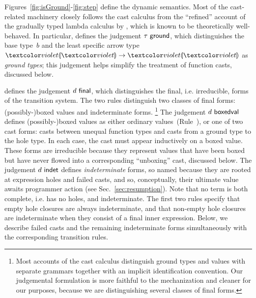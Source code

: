 




Figures~\ref{fig:isGround}-\ref{fig:step} define the dynamic semantics.
%
Most of the cast-related machinery closely follows the cast calculus from
the ``refined'' account of the gradually typed lambda calculus
by \citet{DBLP:conf/snapl/SiekVCB15}, which is known to be
theoretically well-behaved.
%
In particular,  defines the judgement
$\tau~\mathsf{ground}$, which distinguishes the base type~$b$ and the
least specific arrow type~$\tarr{\tehole}{\tehole}$ as \emph{ground
types}; this judgement helps simplify the treatment of function casts, discussed below.

%
 defines the judgement $d~\mathsf{final}$, which
distinguishes the final, i.e. irreducible, forms of the transition system.
%
The two rules distinguish two classes of final forms: (possibly-)boxed values and
indeterminate forms.%
%
\footnote{
        Most accounts of the cast calculus distinguish ground types and values
        with separate grammars together with an
        implicit identification convention.
        Our judgemental formulation is more faithful to the mechanization and
        cleaner for our purposes, because we are distinguishing several
        classes of final forms.
}
The judgement $d~\mathsf{boxedval}$ defines (possibly-)boxed values as either
ordinary values~(Rule~), or one of two cast forms: casts
between unequal function types and casts from a ground type to the hole
type. In each case, the cast must appear inductively on a boxed value.
These forms are irreducible because they represent values that have been
boxed but have never flowed into a corresponding ``unboxing'' cast,
discussed below.
%
%
The judgement $d~\mathsf{indet}$ defines \emph{indeterminate} forms, so named
because they are rooted at expression holes and failed casts, and so,
conceptually, their ultimate value awaits programmer action (see
Sec.~\ref{sec:resumption}). Note that no term is both complete, i.e. has no
holes, and indeterminate.
%
The first two rules specify that {empty} hole closures are always
indeterminate, and that {non}-empty hole closures are indeterminate when
they consist of a {final} inner expression.
%
Below, we describe failed casts and the remaining indeterminate forms simultaneously
with the corresponding transition rules.

